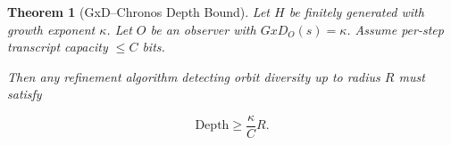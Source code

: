 \documentclass{article}
\newtheorem{theorem}{Theorem}
\begin{document}
\begin{theorem}[GxD–Chronos Depth Bound]
Let $H$ be finitely generated with growth exponent $\kappa$.
Let $O$ be an observer with $GxD_O(s)=\kappa$.
Assume per-step transcript capacity $\le C$ bits.

Then any refinement algorithm detecting orbit diversity up to radius $R$
must satisfy

\[
\mathrm{Depth} \ge \frac{\kappa}{C} R.
\]

\end{theorem}
\end{document}
